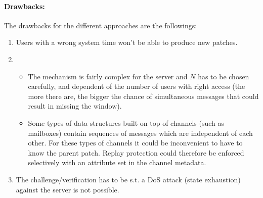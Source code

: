 \paragraph{Drawbacks:}
The drawbacks for the different approaches are the followings:
\begin{enumerate}
  \item Users with a wrong system time won't be able to produce new patches.
  \item
    \begin{itemize}
      \item The mechanism is fairly complex for the server and $N$ has to be chosen carefully, and dependent of the number of users with right access (the more there are, the bigger the chance of simultaneous messages that could result in missing the window).
      \item Some types of data structures built on top of channels (such as mailboxes) contain sequences of messages which are independent of each other.
        For these types of channels it could be inconvenient to have to know the parent patch.
        Replay protection could therefore be enforced selectively with an attribute set in the channel metadata.
    \end{itemize}
  \item The challenge/verification has to be s.t. a \ac{DoS} attack (state exhaustion) against the server is not possible.
\end{enumerate}

